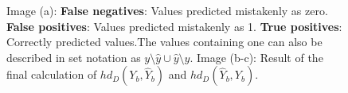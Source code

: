 \begin{figure}[H]
    \caption[Hausdorff calculation result]{Image (a): \textbf{\textcolor{rwuviolet}{False negatives}}: Values predicted mistakenly as zero. \textbf{\textcolor{rwucyan40}{False positives}}: Values predicted mistakenly as 1. \textbf{\textcolor{rwucyan}{True positives}}: Correctly predicted values.The values containing one can also be described in set notation as $y\setminus\hat{y}\cup\hat{y}\setminus y$. Image (b-c): Result of the final calculation of $hd_D(Y_b,\hat{Y}_b)$ and $hd_D(\hat{Y}_b,Y_b)$.}
    \label{hausdorff_y_minus_yhat}
\end{figure}
